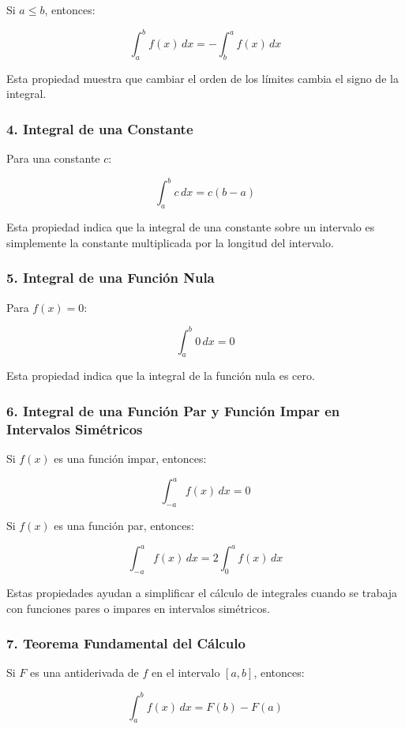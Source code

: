 Si \( a \leq b \), entonces:

\[
\int_{a}^{b} f(x) \, dx = - \int_{b}^{a} f(x) \, dx
\]

Esta propiedad muestra que cambiar el orden de los límites cambia el signo de la integral.

\subsubsection{4. Integral de una Constante}

Para una constante \( c \):

\[
\int_{a}^{b} c \, dx = c (b - a)
\]

Esta propiedad indica que la integral de una constante sobre un intervalo es simplemente la constante multiplicada por la longitud del intervalo.

\subsubsection{5. Integral de una Función Nula}

Para \( f(x) = 0 \):

\[
\int_{a}^{b} 0 \, dx = 0
\]

Esta propiedad indica que la integral de la función nula es cero.

\subsubsection{6. Integral de una Función Par y Función Impar en Intervalos Simétricos}

Si \( f(x) \) es una función impar, entonces:

\[
\int_{-a}^{a} f(x) \, dx = 0
\]

Si \( f(x) \) es una función par, entonces:

\[
\int_{-a}^{a} f(x) \, dx = 2 \int_{0}^{a} f(x) \, dx
\]

Estas propiedades ayudan a simplificar el cálculo de integrales cuando se trabaja con funciones pares o impares en intervalos simétricos.

\subsubsection{7. Teorema Fundamental del Cálculo}

Si \( F \) es una antiderivada de \( f \) en el intervalo \([a, b]\), entonces:

\[
\int_{a}^{b} f(x) \, dx = F(b) - F(a)
\]

